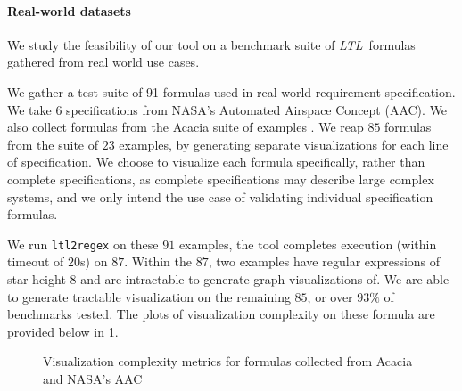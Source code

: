 \documentclass[preprint,12pt]{elsarticle}
\theoremstyle{definition}
\theoremstyle{remark}
\newcommand{\ltl}{\textit{LTL}}
\begin{document}
\paragraph{Real-world datasets} We study the feasibility of our tool on a benchmark suite of \ltl\ formulas gathered from real world use cases.

We gather a test suite of 91 formulas used in real-world requirement specification. We take $6$ specifications from NASA's Automated Airspace Concept (AAC)\cite{GCMTR16}. We also collect formulas from the Acacia suite of examples \cite{RV10}. We reap $85$ formulas from the suite of $23$ examples, by generating separate visualizations for each line of specification. We choose to visualize each formula specifically, rather than complete specifications, as complete specifications may describe large complex systems, and we only intend the use case of validating individual specification formulas. %

We run \texttt{ltl2regex} on these $91$ examples, the tool completes execution (within timeout of $20$s) on $87$. Within the $87$, two examples have regular expressions of star height $8$ and are intractable to generate graph visualizations of. We are able to generate tractable visualization on the remaining $85$, or over $93\%$ of benchmarks tested. The plots of visualization complexity on these formula are provided below in \cref{fig:real-world}.


\begin{figure}[h!]
    \centering
    \quad %
    \caption{Visualization complexity metrics for formulas collected from Acacia \cite{RV10} and NASA's  AAC \cite{GCMTR16}}
    \label{fig:real-world}
\end{figure}
\end{document}
